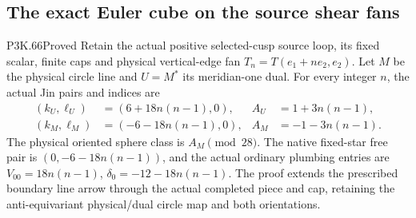 \subsection{The exact Euler cube on the source shear fans}
\begin{statement}{P3K.66}{Proved}
Retain the actual positive selected-cusp source loop, its fixed scalar,
finite caps and physical vertical-edge fan \(T_n=T(e_1+ne_2,e_2)\).
Let \(M\) be the physical circle line and \(U=M^*\) its meridian-one
dual. For every integer \(n\), the actual Jin pairs and indices are
\[
\begin{aligned}
(k_U,\ell_U)&=(6+18n(n-1),0),&A_U&=1+3n(n-1),\\
(k_M,\ell_M)&=(-6-18n(n-1),0),&A_M&=-1-3n(n-1).
\end{aligned}
\]
The physical oriented sphere class is \(A_M\pmod {28}\).
The native fixed-star free pair is \((0,-6-18n(n-1))\), and the
actual ordinary plumbing entries are
\(V_{00}=18n(n-1)\), \(\delta_0=-12-18n(n-1)\).
The proof extends the prescribed boundary line arrow through the
actual completed piece and cap, retaining the anti-equivariant
physical/dual circle map and both orientations.
\end{statement}
